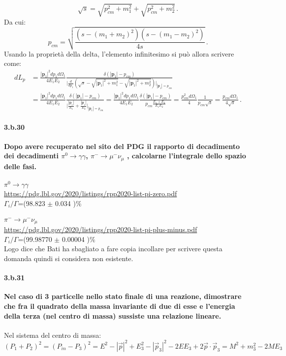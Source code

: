 \documentclass[twoside]{article}
\begin{document}
\begin{equation*}
\sqrt{s}=\sqrt{p_{cm}^2+m_1^2}+\sqrt{p_{cm}^2+m_2^2} \, .
\end{equation*}
Da cui:
\begin{equation*}
p_{cm}=\sqrt{\frac{(s-(m_1+m_2)^2)(s-(m_1-m_2)^2)}{4s}} \, .
\end{equation*}
Usando la proprietà della delta, l'elemento infinitesimo si può allora scrivere come:
\begin{align*}
dL_p&=\frac{|\mathbf{p}_1|^2dp_1d\Omega_1}{4E_1E_2} \frac{\delta(|\mathbf{p}_1|-p_{cm})}{ \bigl| \frac{d}{dp_1}   (\sqrt{s}-\sqrt{|\mathbf{p}_1|^2+m_1^2}-\sqrt{|\mathbf{p}_1|^2+m_2^2}) \bigr|_{|\mathbf{p}_1|=p_{cm}}}\\
&=\frac{|\mathbf{p}_1|^2dp_1d\Omega_1}{4E_1E_2} \frac{\delta(|\mathbf{p}_1|-p_{cm})}{ \bigl| \frac{|\mathbf{p}_1|}{E_1}+\frac{|\mathbf{p}_1|}{E_2} \bigr|_{|\mathbf{p}_1|=p_{cm}}}=\frac{|\mathbf{p}_1|^2dp_1d\Omega_1}{4E_1E_2} \frac{\delta(|\mathbf{p}_1|-p_{cm})}{p_{cm} \frac{E_1+E_2}{E_1E_2}} =\frac{p_{cm}^2d\Omega_1}{4} \frac{1}{p_{cm}\sqrt{s}} =\frac{p_{cm} d\Omega_1}{4 \sqrt{s}} \, .
\end{align*}


\paragraph{3.b.30}\textbf{Dopo avere recuperato nel sito del PDG il rapporto di decadimento dei
decadimenti $\pi^0 \rightarrow \gamma \gamma$, $\pi^- \rightarrow \mu^-\nu_{\mu}$ , calcolarne l'integrale dello spazio delle fasi.}\\
\\
$\pi^0 \rightarrow \gamma \gamma$\\
\url{https://pdg.lbl.gov/2020/listings/rpp2020-list-pi-zero.pdf}\\
$\Gamma_i/\Gamma$=(98.823 $\pm$ 0.034 )\% \\
\\
$\pi^- \rightarrow \mu^-\nu_{\mu}$\\
\url{https://pdg.lbl.gov/2020/listings/rpp2020-list-pi-plus-minus.pdf}\\
$\Gamma_i/\Gamma$=(99.98770 $\pm$ 0.00004 )\% \\
Logo dice che Bati ha sbagliato a fare copia incollare per scrivere questa domanda quindi si considera non esistente.

\paragraph{3.b.31}\textbf{Nel caso di 3 particelle nello stato finale di una reazione, dimostrare che fra il
quadrato della massa invariante di due di esse e l'energia della terza (nel centro di massa) sussiste una relazione lineare.}\\ \\
Nel sistema del centro di massa:
\begin{equation}
    (P_1+P_2)^2=(P_{in}-P_{3})^2=E^2-|\vec{p}|^2+E_3^2-|\vec{p}_3|^2-2EE_3+2\vec{p}\cdot\vec{p}_3=M^2+m_3^2-2ME_3
\end{equation}
\end{document}
